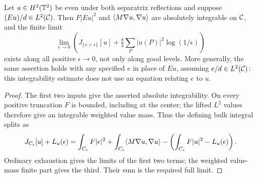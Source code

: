 \begin{lemma}
\label{lem:dd-renormalized-bulk}
\leanok
Let $u\in H^2(\mathbb{T}^2)$ be even under both separatrix reflections and suppose
$(Eu)/d\in L^2(\mathcal{C})$. Then $F|Eu|^2$ and
$\langle M\nabla u,\nabla u\rangle$ are absolutely integrable on $\mathcal{C}$, and the
finite limit
\[
 \lim_{\epsilon\to0}\left(J_{\{s>\epsilon\}}[u]
            +\tfrac83\sum_P|u(P)|^2\log(1/\epsilon)\right)
\]
exists along all positive $\epsilon\to0$, not only along good levels.
More generally, the same assertion holds with any specified $e$ in place of
$Eu$, assuming $e/d\in L^2(\mathcal{C})$: this integrability estimate does not use
an equation relating $e$ to $u$.
\end{lemma}

\begin{proof}
\leanok
The first two inputs give the asserted absolute integrability.
On every positive truncation $F$ is bounded, including at the center;
the lifted $L^2$ values therefore give an integrable weighted value mass.
Thus the defining bulk integral splits as
\[
 J_{C_\epsilon}[u]+L_u(\epsilon)
 =\int_{C_\epsilon}F|e|^2
  +\int_{C_\epsilon}\langle M\nabla u,\nabla u\rangle
  -\left(\int_{C_\epsilon}F|u|^2-L_u(\epsilon)\right).
\]
Ordinary exhaustion gives the limits of the first two terms; the weighted
value-mass finite part gives the third. Their sum is the required full limit.
\end{proof}

